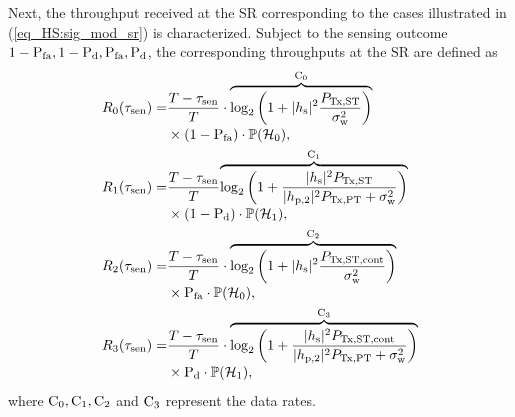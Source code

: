 Next, the throughput received at the SR corresponding to the cases illustrated in (\ref{eq_HS:sig_mod_sr}) is characterized. Subject to the sensing outcome $1 - \pfa, 1 - \pd, \pfa, \pd$, the corresponding throughputs at the SR are defined as 
\begin{align}
\rsz(\tsen) =& \frac{T- \tsen}{T} \cdot \smash[b]{\overbrace{\log_2 \left(1 + |\hs|^2 \frac{\pfull}{\npo}\right)}^{\cz}} \nonumber \\ 
\quad & \times (1 - \pfa ) \cdot \phz,  \label{eq_HS:Cap0} \\ 
\rso(\tsen) =& \frac{T- \tsen}{T} \smash[b]{\overbrace{\log_2 \left(1 + \frac{|\hs|^2 \pfull }{|\hptw|^2 \ptranpt  + \npo} \right)}^{\co}} \nonumber \\ 
\quad & \times (1 - \pd) \cdot \pho,  \label{eq_HS:Cap1} \\ 
\rstw(\tsen) =& \frac{T- \tsen}{T} \cdot \smash[b]{\overbrace{\log_2 \left(1 + |\hs|^2 \frac{\preg}{\npo}\right)}^{\ctw}} \nonumber \\ 
\quad & \times \pfa \cdot \phz,  \label{eq_HS:Cap2} \\ 
\rsth(\tsen) =& \frac{T- \tsen}{T} \cdot \smash[b]{\overbrace{\log_2 \left(1 + \frac{|\hs|^2 \preg }{|\hptw|^2 \ptranpt  + \npo} \right)}^{\cth}}  \nonumber \\   
\quad & \times \pd \cdot \pho,  \label{eq_HS:Cap3}  
\end{align}
where $\cz, \co, \ctw$ and $\cth$ represent the data rates.

